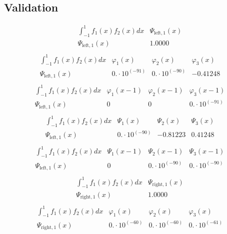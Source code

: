 \documentclass{article}
\begin{document}
 \begin{landscape}
 \subsection{Validation}$$ \begin{array}{l|l}
\int_{-1}^1 f_1(x)f_2(x) dx& \Psi_{\text{left},1}(x) \\ \hline 
 \Psi_{\text{left},1}(x) & 1.0000 \\ 
\end{array} $$
$$ \begin{array}{l|lll}
\int_{-1}^1 f_1(x)f_2(x) dx& \varphi_1(x)& \varphi_2(x)& \varphi_3(x) \\ \hline 
 \Psi_{\text{left},1}(x) & 0.\cdot 10^{(-91)} & 0.\cdot 10^{(-90)} & -0.41248 \\ 
\end{array} $$ 
$$ \begin{array}{l|lll}
\int_{-1}^1 f_1(x)f_2(x) dx& \varphi_1(x-1)& \varphi_2(x-1)& \varphi_3(x-1) \\ \hline 
 \Psi_{\text{left},1}(x) & 0 & 0 & 0.\cdot 10^{(-91)} \\ 
\end{array} $$ 
$$ \begin{array}{l|lll}
\int_{-1}^1 f_1(x)f_2(x) dx& \Psi_1(x)& \Psi_2(x)& \Psi_3(x) \\ \hline 
 \Psi_{\text{left},1}(x) & 0.\cdot 10^{(-90)} & -0.81223 & 0.41248 \\ 
\end{array} $$ 
$$ \begin{array}{l|lll}
\int_{-1}^1 f_1(x)f_2(x) dx& \Psi_1(x-1)& \Psi_2(x-1)& \Psi_3(x-1) \\ \hline 
 \Psi_{\text{left},1}(x) & 0 & 0.\cdot 10^{(-90)} & 0.\cdot 10^{(-90)} \\ 
\end{array} $$ 
$$ \begin{array}{l|l}
\int_{-1}^1 f_1(x)f_2(x) dx& \Psi_{\text{right},1}(x) \\ \hline 
 \Psi_{\text{right},1}(x) & 1.0000 \\ 
\end{array} $$
$$ \begin{array}{l|lll}
\int_{-1}^1 f_1(x)f_2(x) dx& \varphi_1(x)& \varphi_2(x)& \varphi_3(x) \\ \hline 
 \Psi_{\text{right},1}(x) & 0.\cdot 10^{(-60)} & 0.\cdot 10^{(-60)} & 0.\cdot 10^{(-61)} \\ 
\end{array} $$ 

\end{landscape}
\end{document}
